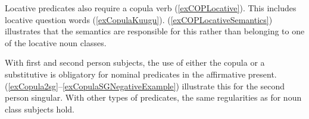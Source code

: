 Locative predicates also require a copula verb (\ref{exCOPLocative}). This includes locative question words (\ref{exCopulaKuugu}). (\ref{exCOPLocativeSemantics}) illustrates that the  semantics are responsible for this rather than belonging to one of the locative noun classes.

\begin{exe}
\ex \label{exCOPLocative}
\begin{xlist}
\end{xlist}
\ex \label{exCopulaKuugu}
\begin{xlist}
\end{xlist}

\ex\label{exCOPLocativeSemantics}
\begin{xlist}
\end{xlist}
\end{exe}

With first and second person subjects, the use of either the copula or a substitutive is obligatory for nominal predicates in the affirmative present. (\ref{exCopula2sg}--\ref{exCopulaSGNegativeExample}) illustrate this for the second person singular. With other types of predicates, the same regularities as for noun class subjects hold.

\begin{exe}
\end{exe}

